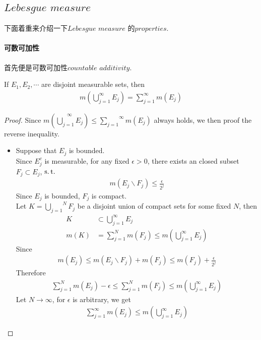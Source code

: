 \newpage
\subsection{$Lebesgue \,\, measure$}
	下面着重来介绍一下$Lebesgue \,\, measure$ 的$properties$.
	
	\vspace{2em}
\paragraph{可数可加性}
	首先便是可数可加性$countable \,\, additivity$.
	\begin{thm}\label{thm 1.3.2}
		If $E_1 , E_2 , \cdots $ are disjoint measurable sets, then
		\begin{align}
			m(\bigcup_{j = 1}^{\infty}{E_j}) = \sum_{j = 1}^{\infty}{m(E_j)}
		\end{align}
	
		\vspace{2em}
		\begin{proof}
			Since $m(\overset{\infty}{\underset{j = 1}{\bigcup}{E_j}}) \leq \overset{\infty}{\underset{j = 1}{\sum}}{m(E_j)}$ always holds, we then proof the reverse inequality.
			\begin{itemize}
				\item Suppose that $E_j$ is bounded.\\
				Since $E_{j}^c$ is measurable, for any fixed $\epsilon > 0$, there exists an closed subset $F_j \subset E_j$, $\operatorname{s.t.}$
				\begin{align}
					m(E_j \backslash F_j) \leq \frac{\epsilon}{2^j}
				\end{align}
				Since $E_j$ is bounded, $F_j$ is compact. \\
				Let $K = \overset{N}{\underset{j = 1}{\bigcup}}{F_j}$ be a disjoint union of compact sets for some fixed $N$, then
				\begin{align}
					K &\subset \bigcup_{j = 1}^{\infty}{E_j} \\
					m(K) &= \sum_{j = 1}^{N}{m(F_j)} \leq m(\bigcup_{j = 1}^{\infty}{E_j})
				\end{align}
				Since
				\begin{align}
					m(E_j) \leq m(E_j \backslash F_j) + m(F_j) \leq m(F_j) + \frac{\epsilon}{2^j}
				\end{align}
				Therefore
				\begin{align}
					\sum_{j = 1}^{N}{m(E_j)} - \epsilon \leq \sum_{j = 1}^{N}{m(F_j)} \leq m(\bigcup_{j = 1}^{\infty}{E_j})
				\end{align}
				Let $N \to \infty$, for $\epsilon$ is arbitrary, we get
				\begin{align}
					\sum_{j = 1}^{\infty}{m(E_j)} \leq m(\bigcup_{j = 1}^{\infty}{E_j})
				\end{align}
			

\end{itemize}
\end{proof}
\end{thm}
